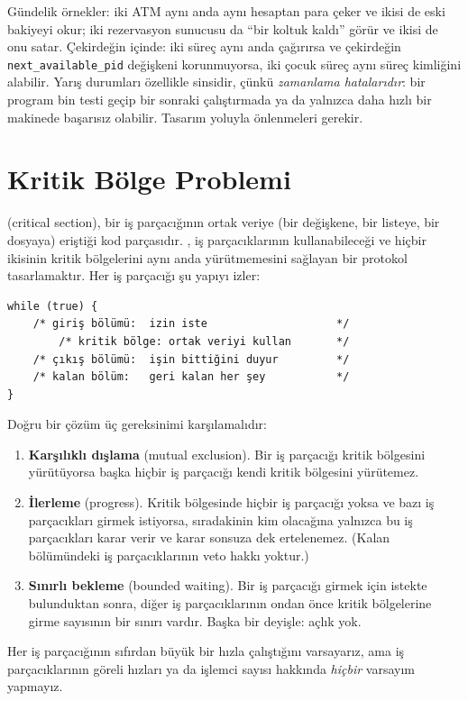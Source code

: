 Gündelik örnekler: iki ATM aynı anda aynı hesaptan para çeker ve ikisi de eski bakiyeyi okur; iki rezervasyon sunucusu da ``bir koltuk kaldı'' görür ve ikisi de onu satar. Çekirdeğin içinde: iki süreç aynı anda  çağırırsa ve çekirdeğin \texttt{next\_available\_pid} değişkeni korunmuyorsa, iki çocuk süreç aynı süreç kimliğini alabilir. Yarış durumları özellikle sinsidir, çünkü \emph{zamanlama hatalarıdır}: bir program bin testi geçip bir sonraki çalıştırmada ya da yalnızca daha hızlı bir makinede başarısız olabilir. Tasarım yoluyla önlenmeleri gerekir.

\section{Kritik Bölge Problemi}
\label{sec:cs}

 (critical section), bir iş parçacığının ortak veriye (bir değişkene, bir listeye, bir dosyaya) eriştiği kod parçasıdır. , iş parçacıklarının kullanabileceği ve hiçbir ikisinin kritik bölgelerini aynı anda yürütmemesini sağlayan bir protokol tasarlamaktır. Her iş parçacığı şu yapıyı izler:

\begin{lstlisting}
while (true) {
    /* giriş bölümü:  izin iste                    */
        /* kritik bölge: ortak veriyi kullan       */
    /* çıkış bölümü:  işin bittiğini duyur         */
    /* kalan bölüm:   geri kalan her şey           */
}
\end{lstlisting}

Doğru bir çözüm üç gereksinimi karşılamalıdır:
\begin{enumerate}[leftmargin=1.4em]
  \item \textbf{Karşılıklı dışlama} (mutual exclusion). Bir iş parçacığı kritik bölgesini yürütüyorsa başka hiçbir iş parçacığı kendi kritik bölgesini yürütemez.
  \item \textbf{İlerleme} (progress). Kritik bölgesinde hiçbir iş parçacığı yoksa ve bazı iş parçacıkları girmek istiyorsa, sıradakinin kim olacağına yalnızca bu iş parçacıkları karar verir ve karar sonsuza dek ertelenemez. (Kalan bölümündeki iş parçacıklarının veto hakkı yoktur.)
  \item \textbf{Sınırlı bekleme} (bounded waiting). Bir iş parçacığı girmek için istekte bulunduktan sonra, diğer iş parçacıklarının ondan önce kritik bölgelerine girme sayısının bir sınırı vardır. Başka bir deyişle: açlık yok.
\end{enumerate}
Her iş parçacığının sıfırdan büyük bir hızla çalıştığını varsayarız, ama iş parçacıklarının göreli hızları ya da işlemci sayısı hakkında \emph{hiçbir} varsayım yapmayız.

